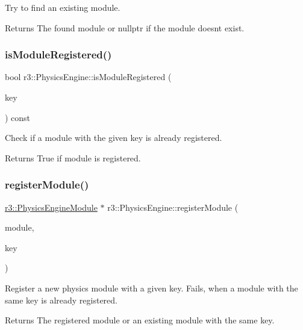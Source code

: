 Try to find an existing module. \begin{DoxyReturn}{Returns}
The found module or nullptr if the module doesn\textquotesingle{}t exist. 
\end{DoxyReturn}
\mbox{\label{classr3_1_1_physics_engine_ad24c27b1288eb3b4d18be70a5e257e4b}} 
\subsubsection{\texorpdfstring{is\+Module\+Registered()}{isModuleRegistered()}}
{\footnotesize\ttfamily bool r3\+::\+Physics\+Engine\+::is\+Module\+Registered (\begin{DoxyParamCaption}\item[{const std\+::string \&}]{key }\end{DoxyParamCaption}) const}

Check if a module with the given key is already registered. \begin{DoxyReturn}{Returns}
True if module is registered. 
\end{DoxyReturn}
\mbox{\label{classr3_1_1_physics_engine_aead3d2707fa52fc65701a55b811b571e}} 
\subsubsection{\texorpdfstring{register\+Module()}{registerModule()}}
{\footnotesize\ttfamily \mbox{\hyperlink{classr3_1_1_physics_engine_module}{r3\+::\+Physics\+Engine\+Module}} $\ast$ r3\+::\+Physics\+Engine\+::register\+Module (\begin{DoxyParamCaption}\item[{\mbox{\hyperlink{classr3_1_1_physics_engine_module}{Physics\+Engine\+Module}} $\ast$}]{module,  }\item[{const std\+::string \&}]{key }\end{DoxyParamCaption})}

Register a new physics module with a given key. Fails, when a module with the same key is already registered. \begin{DoxyReturn}{Returns}
The registered module or an existing module with the same key. 
\end{DoxyReturn}
\mbox{\label{classr3_1_1_physics_engine_aba6b8345f61da6e9e1baa6c745eb1803}} 
